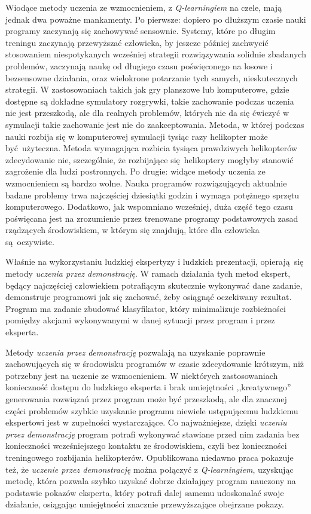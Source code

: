 Wiodące metody uczenia ze wzmocnieniem, z \textit{Q-learningiem} na czele, mają jednak dwa poważne mankamenty. Po pierwsze: dopiero po dłuższym czasie nauki programy zaczynają się zachowywać sensownie. Systemy, które po długim treningu zaczynają przewyższać człowieka, by jeszcze później zachwycić stosowaniem niespotykanych wcześniej strategii rozwiązywania solidnie zbadanych problemów, zaczynają naukę od długiego czasu poświęconego na losowe i bezsensowne działania, oraz wielokrone potarzanie tych samych, nieskutecznych strategii. W zastosowaniach takich jak gry planszowe lub komputerowe, gdzie dostępne są dokładne symulatory rozgrywki, takie zachowanie podczas uczenia nie jest przeszkodą, ale dla realnych problemów, których nie da się ćwiczyć w symulacji takie zachowanie jest nie do zaakceptowania. Metoda, w której podczas nauki rozbija się w komputerowej symulacji tysiąc razy helikopter może być użyteczna. Metoda wymagająca rozbicia tysiąca prawdziwych helikopterów zdecydowanie nie, szczególnie, że rozbijające się helikoptery mogłyby stanowić zagrożenie dla ludzi postronnych. Po drugie: widące metody uczenia ze wzmocnieniem są bardzo wolne. Nauka programów rozwiązujących aktualnie badane problemy trwa najczęściej dziesiątki godzin i wymaga potężnego sprzętu komputerowego. Dodatkowo, jak wspomniano wcześniej, duża część tego czasu poświęcana jest na zrozumienie przez trenowane programy podstawowych zasad rządzących środowiskiem, w którym się znajdują, które dla człowieka są oczywiste.

Właśnie na wykorzystaniu ludzkiej ekspertyzy i ludzkich prezentacji, opierają się metody \textit{uczenia przez demonstrację}. W ramach działania tych metod ekspert, będący najczęściej człowiekiem potrafiącym skutecznie wykonywać dane zadanie, demonstruje programowi jak się zachować, żeby osiągnąć oczekiwany rezultat. Program ma zadanie zbudować klasyfikator, który minimalizuje rozbieżności pomiędzy akcjami wykonywanymi w danej sytuacji przez program i przez eksperta.

Metody \textit{uczenia przez demonstrację} pozwalają na uzyskanie poprawnie zachowujących się w środowisku programów w czasie zdecydowanie krótszym, niż potrzebny jest na uczenie ze wzmocnieniem. W niektórych zastosowaniach konieczność dostępu do ludzkiego eksperta i brak umiejętności ,,kreatywnego'' generowania rozwiązań przez program może być przeszkodą, ale dla znacznej części problemów szybkie uzyskanie programu niewiele ustępującemu ludzkiemu ekspertowi jest w zupełności wystarczające. Co najważniejsze, dzięki \textit{uczeniu przez demonstrację} program potrafi wykonywać stawiane przed nim zadania bez konieczności wcześniejszego kontaktu ze środowiskiem, czyli bez konieczności treningowego rozbijania helikopterów. Opublikowana niedawno praca \cite{DBLP:journals/corr/HesterVPLSPSDOA17} pokazuje też, że \textit{uczenie przez demonstrację} można połączyć z \textit{Q-learningiem}, uzyskując metodę, która pozwala szybko uzyskać dobrze działający program nauczony na podstawie pokazów eksperta, który potrafi dalej samemu udoskonalać swoje działanie, osiągając umiejętności znacznie przewyższające obejrzane pokazy.


